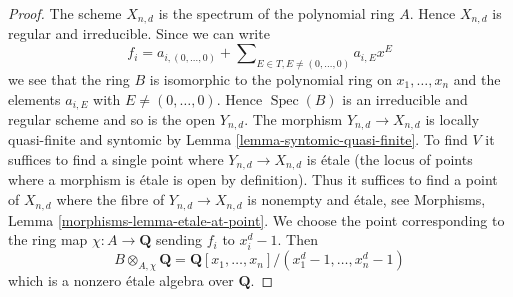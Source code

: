 \documentclass[10pt,a4paper]{amsart}
\theoremstyle{plain}
\theoremstyle{definition}
\theoremstyle{remark}
\numberwithin{equation}{subsection}
\def\Spec{\mathop{\mathrm{Spec}}}
\begin{document}
\begin{proof}
The scheme $X_{n, d}$ is the spectrum of the polynomial ring $A$.
Hence $X_{n, d}$ is regular and irreducible. Since we can write
$$
f_i = a_{i, (0, \ldots, 0)} +
\sum\nolimits_{E \in T, E \not = (0, \ldots, 0)} a_{i, E} x^E
$$
we see that the ring $B$ is isomorphic to the polynomial ring
on $x_1, \ldots, x_n$ and the elements $a_{i, E}$ with
$E \not = (0, \ldots, 0)$. Hence $\Spec(B)$ is an irreducible and
regular scheme and so is the open $Y_{n, d}$. The morphism
$Y_{n, d} \to X_{n, d}$ is locally quasi-finite and syntomic by
Lemma \ref{lemma-syntomic-quasi-finite}. To find $V$ it suffices
to find a single point where $Y_{n, d} \to X_{n, d}$ is \'etale
(the locus of points where a morphism is \'etale is open by
definition). Thus it suffices to find a point of $X_{n, d}$
where the fibre of $Y_{n, d} \to X_{n, d}$ is nonempty and \'etale, see
Morphisms, Lemma \ref{morphisms-lemma-etale-at-point}. We choose
the point corresponding to the ring map $\chi : A \to \mathbf{Q}$
sending $f_i$ to $x_i^d - 1$. Then
$$
B \otimes_{A, \chi} \mathbf{Q} =
\mathbf{Q}[x_1, \ldots, x_n]/(x_1^d - 1, \ldots, x_n^d - 1)
$$
which is a nonzero \'etale algebra over $\mathbf{Q}$.
\end{proof}
\end{document}
